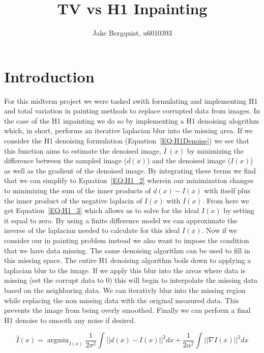 \documentclass[12pt]{article}
\DeclareMathOperator*{\argmin}{argmin}
\begin{document}
\title{TV vs H1 Inpainting}
\author{Jake Bergquist, u6010393 }
\maketitle

\section{Introduction}
\par{}
For this midterm project we were tasked swith formulating and implementing H1 and total variation in painting methods to replace corrupted data from images. In the case of the H1 inpainting we do so by implementing a H1 denoising alogrithm  which, in short, performs an iterative laplacian blur into the missing area. If we consider the H1 denoising formulation (Equation~\ref{EQ:H1Denoise}) we see that this function aims to estimate the denoised image, $\hat{I}~(x)$ by minimizing the difference between the sampled image ($d(x)$) and the denoised image ($I(x)$) as well as the gradient of the denoised image. By integrating these terms we find that we can simplify to Equation~\ref{EQ:H1_2} wherein our minimization changes to minimizing the sum of the inner products of $d(x)-I(x)$ with itself plus the inner product of the negative laplacin of $I(x)$ with $I(x)$. From here we get Equation~\ref{EQ:H1_3} which allows us to solve for the ideal $I(x)$ by setting it equal to zero. By using a finite difference model we can approximate the inverse of the laplacian needed to calculate for this ideal $I(x)$. Now if we consider our in painting problem instead we also want to impose the condition that we have data missing. The same denoising algorithm can be used to fill in this missing space. The entire H1 denoising algorithm boils down to applying a laplacian blur to the image. If we apply this blur into the areas where data is missing (set the corrupt data to 0) this will begin to interpolate the missing data based on the neighboring data. We can iterativly blur into the missing region while replacing the non missing data with the original measured data. This prevents the image from being overly smoothed. Finally we can perform a final H1 denoise to smooth any noise if desired.

\begin{equation}
\hat{I}(x) = \argmin_{I(x)} \frac{1}{2\sigma^2} \int_{}^{}||d(x) - I(x)||^2 dx + \frac{1}{2\alpha^2}\int_{}^{}||\nabla I(x)||^2 dx 
\label{EQ:H1Denoise}
\end{equation}
\end{document}
